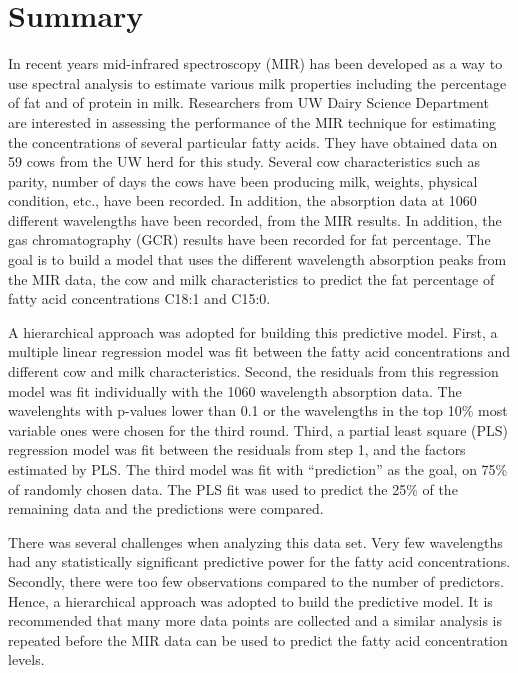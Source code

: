 \section*{Summary}\label{Sec_Summary}
In recent years mid-infrared spectroscopy (MIR) has been developed as a way to use spectral analysis to estimate various milk properties including the percentage of fat and of protein in milk. Researchers from UW Dairy Science Department are interested in assessing the performance of the MIR technique for estimating the concentrations of several particular fatty acids. They have obtained data on 59 cows from the UW herd for this study. Several cow characteristics such as parity, number of days the cows have been producing milk, weights, physical condition, etc., have been recorded. In addition, the absorption data at 1060 different wavelengths have been recorded, from the MIR results. In addition, the gas chromatography (GCR) results have been recorded for fat percentage. The goal is to build a model that uses the different wavelength absorption peaks from the MIR data, the cow and milk characteristics to predict the fat percentage of fatty acid concentrations C18:1 and C15:0. 

A hierarchical approach was adopted for building this predictive model. First, a multiple linear regression model was fit between the fatty acid concentrations and different cow and milk characteristics. Second, the residuals from this regression model was fit individually with the 1060 wavelength absorption data. The wavelenghts with p-values lower than 0.1 or the wavelengths in the top 10\% most variable ones were chosen for the third round. Third, a partial least square (PLS) regression model was fit between the residuals from step 1, and the factors estimated by PLS. The third model was fit with ``prediction'' as the goal, on 75\% of randomly chosen data. The PLS fit was used to predict the 25\% of the remaining data and the predictions were compared. 

There was several challenges when analyzing this data set. Very few wavelengths had any statistically significant predictive power for the fatty acid concentrations. Secondly, there were too few observations compared to the number of predictors. Hence, a hierarchical approach was adopted to build the predictive model. It is recommended that many more data points are collected and a similar analysis is repeated before the MIR data can be used to predict the fatty acid concentration levels. 

